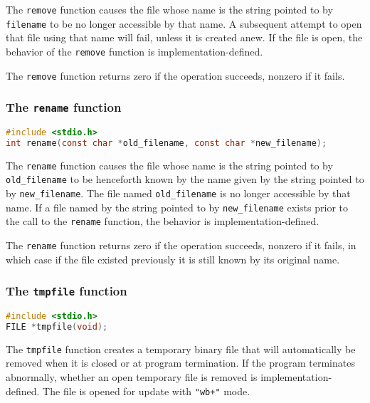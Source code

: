 The \texttt{remove} function causes the file whose name is the string pointed
to by \texttt{filename} to be no longer accessible by that name. A subsequent
attempt to open that file using that name will fail, unless it is created anew.
If the file is open, the behavior of the \texttt{remove} function is
implementation-defined.

The \texttt{remove} function returns zero if the operation succeeds, nonzero if
it fails.

\subsubsection{The \texttt{rename} function}
\lstset{basicstyle=\scriptsize, numbers=left, captionpos=b, tabsize=4}
\begin{lstlisting}[caption=Section \thesection listing \arabic{filecnt},language={C},
breaklines=true,xleftmargin=15pt,label=lst:section\thesection listing\arabic{filecnt}]
#include <stdio.h>
int rename(const char *old_filename, const char *new_filename);
\end{lstlisting}

The \texttt{rename} function causes the file whose name is the string pointed
to by \texttt{old\_filename} to be henceforth known by the name given by the
string pointed to by \texttt{new\_filename}. The file named
\texttt{old\_filename} is no longer accessible by that name. If a file named by
the string pointed to by \texttt{new\_filename} exists prior to the call to the
\texttt{rename} function, the behavior is implementation-defined.

The \texttt{rename} function returns zero if the operation succeeds, nonzero if
it fails, in which case if the file existed previously it is still known by its
original name.

\subsubsection{The \texttt{tmpfile} function}
\lstset{basicstyle=\scriptsize, numbers=left, captionpos=b, tabsize=4}
\begin{lstlisting}[caption=Section \thesection listing \arabic{filecnt},language={C},
breaklines=true,xleftmargin=15pt,label=lst:section\thesection listing\arabic{filecnt}]
#include <stdio.h>
FILE *tmpfile(void);
\end{lstlisting}

The \texttt{tmpfile} function creates a temporary binary file that will
automatically be removed when it is closed or at program termination. If the
program terminates abnormally, whether an open temporary file is removed is
implementation-defined. The file is opened for update with \texttt{"wb+"} mode.

